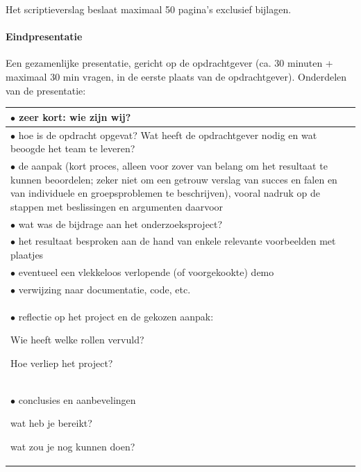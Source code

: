 Het scriptieverslag beslaat maximaal 50 pagina's exclusief bijlagen.
\paragraph{Eindpresentatie}
Een gezamenlijke presentatie, gericht op de opdrachtgever (ca. 30 minuten +
maximaal 30 min vragen, in de eerste plaats van de opdrachtgever).  Onderdelen
van de presentatie:
\begin{center}
\begin{tabular}{p{30em}}
    \par $\bullet$ zeer kort: wie zijn wij?
    \\\hline
    \par $\bullet$ hoe is de opdracht opgevat? Wat heeft de opdrachtgever nodig en wat beoogde
	    het team te leveren?
    \\\hline
    \par $\bullet$ de aanpak (kort proces, alleen voor zover van belang om het resultaat te
	kunnen beoordelen; zeker niet om een getrouw verslag van succes en falen en van
	individuele en groepsproblemen te beschrijven), vooral nadruk op de stappen met
	beslissingen en argumenten daarvoor
    \\\hline
    \par $\bullet$ wat was de bijdrage aan het onderzoeksproject?
    \\\hline
    \par $\bullet$ het resultaat besproken aan de hand van enkele
	relevante voorbeelden met plaatjes
    \\\hline
    \par $\bullet$ eventueel een vlekkeloos verlopende (of voorgekookte) demo
    \\\hline
    \par $\bullet$ verwijzing naar documentatie, code, etc.
    \\\hline
    \par $\bullet$ reflectie op het project en de gekozen aanpak:
	\par \qquad \leftpointright{} Wie heeft welke rollen vervuld?
	\par \qquad \leftpointright{} Hoe verliep het project?
    \\\hline
    \par $\bullet$ conclusies en aanbevelingen
	\par \qquad \leftpointright{} wat heb je bereikt?
	\par \qquad \leftpointright{} wat zou je nog kunnen doen?
    \\\hline
\end{tabular}
\end{center}

